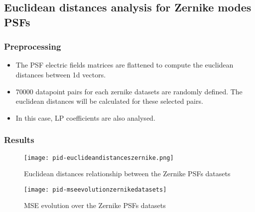 \subsection{Euclidean distances analysis for Zernike modes PSFs}

	\subsubsection{Preprocessing}
		
		\begin{itemize}
			\item The PSF electric fields matrices are flattened to compute the euclidean distances between 1d vectors.
			\item 70000 datapoint pairs for each zernike datasets are randomly defined. The euclidean distances will be calculated for these selected pairs.
			\item In this case, LP coefficients are also analysed.
		\end{itemize}
			
	\subsubsection{Results}
		\begin{figure*}[ht!]
			\centering
			\texttt{[image: pid-euclideandistanceszernike.png]}
			\caption{Euclidean distances relationship between the Zernike PSFs datasets}
		\end{figure*}
		
		\begin{figure*}[ht!]
			\centering
			\texttt{[image: pid-mseevolutionzernikedatasets]}
			\caption{MSE evolution over the Zernike PSFs datasets}
		\end{figure*}
		
